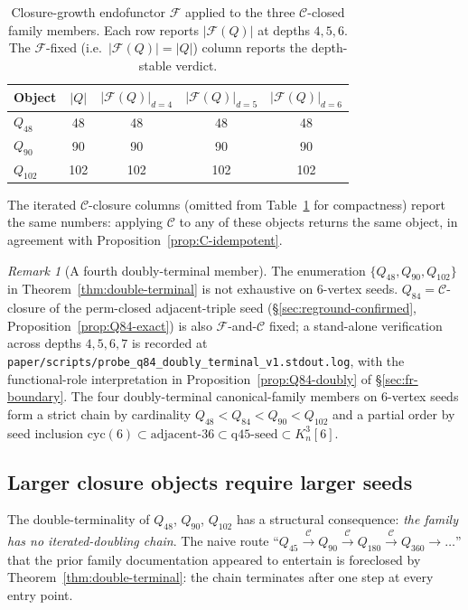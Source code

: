 \documentclass[12pt,a4paper]{article}
\theoremstyle{definition}
\theoremstyle{remark}
\newtheorem{remark}[theorem]{Remark}
\newcommand{\Kn}{K_n^3}
\newcommand{\Ccls}{\mathcal{C}}             %
\newcommand{\Fcls}{\mathcal{F}}             %
\newcommand{\cyc}{\mathrm{cyc}}
\begin{document}
\begin{table}[H]\small
\centering
\caption{Closure-growth endofunctor $\Fcls$ applied to the three
$\Ccls$-closed family members. Each row reports
$|\Fcls(Q)|$ at depths $4, 5, 6$. The $\Fcls$-fixed (i.e.\
$|\Fcls(Q)| = |Q|$) column reports the depth-stable
verdict.}\label{tab:F-fixed}
\begin{tabular}{@{}lcccc@{}}
\toprule
Object & $|Q|$ & $|\Fcls(Q)|_{d=4}$ & $|\Fcls(Q)|_{d=5}$ & $|\Fcls(Q)|_{d=6}$ \\
\midrule
$Q_{48}$  & 48  & 48  & 48  & 48  \\
$Q_{90}$  & 90  & 90  & 90  & 90  \\
$Q_{102}$ & 102 & 102 & 102 & 102 \\
\bottomrule
\end{tabular}
\end{table}

The iterated $\Ccls$-closure columns (omitted from
Table~\ref{tab:F-fixed} for compactness) report the same numbers:
applying $\Ccls$ to any of these objects returns the same object, in
agreement with Proposition~\ref{prop:C-idempotent}.

\begin{remark}[A fourth doubly-terminal member]\label{rem:Q84-doubly}
The enumeration $\{Q_{48}, Q_{90}, Q_{102}\}$ in
Theorem~\ref{thm:double-terminal} is not exhaustive on 6-vertex
seeds. $Q_{84} = \Ccls$-closure of the perm-closed adjacent-triple
seed (\S\ref{sec:reground-confirmed},
Proposition~\ref{prop:Q84-exact}) is also $\Fcls$-and-$\Ccls$ fixed;
a stand-alone verification across depths $4, 5, 6, 7$ is recorded at
\texttt{paper/scripts/probe\_q84\_doubly\_terminal\_v1.stdout.log},
with the functional-role interpretation in
Proposition~\ref{prop:Q84-doubly} of \S\ref{sec:fr-boundary}. The
four doubly-terminal canonical-family members on 6-vertex seeds form
a strict chain by cardinality $Q_{48} < Q_{84} < Q_{90} < Q_{102}$
and a partial order by seed inclusion
$\cyc(6) \subset \text{adjacent-36} \subset \text{q45-seed} \subset
\Kn[6]$.
\end{remark}

\subsection{Larger closure objects require larger seeds}
\label{sec:term-larger}

The double-terminality of $Q_{48}$, $Q_{90}$, $Q_{102}$ has a
structural consequence: \emph{the family has no iterated-doubling
chain}. The naive route ``$Q_{45} \xrightarrow{\Ccls} Q_{90}
\xrightarrow{\Ccls} Q_{180} \xrightarrow{\Ccls} Q_{360} \to \dots$''
that the prior family documentation appeared to entertain is foreclosed
by Theorem~\ref{thm:double-terminal}: the chain terminates after one
step at every entry point.
\end{document}
